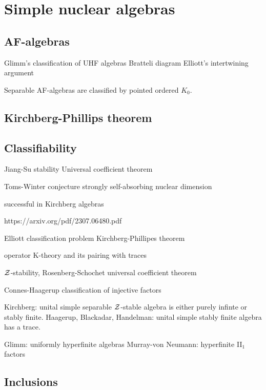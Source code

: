 \documentclass{../../large}
\begin{document}
\chapter{Simple nuclear algebras}


\section{AF-algebras}

Glimm's classification of UHF algebras
Bratteli diagram
Elliott's intertwining argument

Separable AF-algebras are classified by pointed ordered $K_0$.


\section{Kirchberg-Phillips theorem}

\section{Classifiability}
Jiang-Su stability
Universal coefficient theorem

Toms-Winter conjecture
strongly self-absorbing
nuclear dimension




successful in Kirchberg algebras


https://arxiv.org/pdf/2307.06480.pdf

Elliott classification problem
Kirchberg-Phillipes theorem

operator K-theory and its pairing with traces

$\mathcal{Z}$-stability, Rosenberg-Schochet universal coefficient theorem

Connes-Haagerup classification of injective factors

Kirchberg: unital simple separable $\mathcal{Z}$-stable algebra is either purely infinte or stably finite.
Haagerup, Blackadar, Handelman: unital simple stably finite algebra has a trace.

Glimm: uniformly hyperfinite algebras
Murray-von Neumann: hyperfinite II$_1$ factors




\section{Inclusions}
\end{document}

